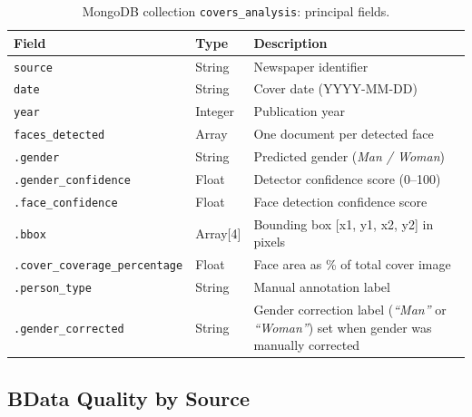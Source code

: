 \documentclass[11pt,a4paper]{article}
\begin{document}
\begin{table}[H]
\centering\small
\caption{MongoDB collection \texttt{covers\_analysis}: principal fields.}
\label{tab:schema_covers}
\begin{tabularx}{\textwidth}{p{5.5cm}lX}
\toprule
\textbf{Field} & \textbf{Type} & \textbf{Description} \\
\midrule
\texttt{source}          & String  & Newspaper identifier \\
\texttt{date}            & String  & Cover date (YYYY-MM-DD) \\
\texttt{year}            & Integer & Publication year \\
\texttt{faces\_detected} & Array   & One document per detected face \\
\quad\texttt{.gender}                     & String  & Predicted gender (\textit{Man / Woman}) \\
\quad\texttt{.gender\_confidence}         & Float   & Detector confidence score (0–100) \\
\quad\texttt{.face\_confidence}           & Float   & Face detection confidence score \\
\quad\texttt{.bbox}                       & Array[4]& Bounding box [x1, y1, x2, y2] in pixels \\
\quad\texttt{.cover\_coverage\_percentage}& Float   & Face area as \% of total cover image \\
\quad\texttt{.person\_type}               & String  & Manual annotation label \\
\quad\texttt{.gender\_corrected}          & String  & Gender correction label (\textit{``Man''} or \textit{``Woman''}) set when gender was manually corrected \\
\bottomrule
\end{tabularx}
\end{table}

\label{app:quality}
\subsection*{B\quad Data Quality by Source}
\end{document}
